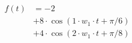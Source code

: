 \correct
\begin{center}
\begin{align*}
f(t)
&= -2 \\
&+ 8 \cdot \cos( 1 \cdot w_1 \cdot t + \pi/6) \\
&+ 4 \cdot \cos( 2 \cdot w_1 \cdot t + \pi/8)
\end{align*}
\end{center}
